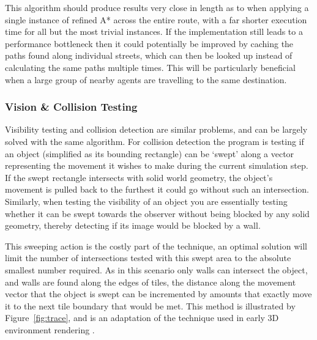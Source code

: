 \documentclass[12pt,a4paper]{article}
\begin{document}
This algorithm should produce results very close in length as to when applying a single instance of refined A* across the entire route, with a far shorter execution time for all but the most trivial instances. If the implementation still leads to a performance bottleneck then it could potentially be improved by caching the paths found along individual streets, which can then be looked up instead of calculating the same paths multiple times. This will be particularly beneficial when a large group of nearby agents are travelling to the same destination.

\subsubsection{Vision \& Collision Testing}\noindent
Visibility testing and collision detection are similar problems, and can be largely solved with the same algorithm. For collision detection the program is testing if an object (simplified as its bounding rectangle)
can be `swept' along a vector representing the movement it wishes to make during the current simulation step. If the swept rectangle intersects with solid world geometry, the object's movement is pulled back to the furthest it could go without such an intersection. Similarly, when testing the visibility of an object you are essentially testing whether it can be swept towards the observer without being blocked by any solid geometry, thereby detecting if its image would be blocked by a wall.

This sweeping action is the costly part of the technique, an optimal solution will limit the number of intersections tested with this swept area to the absolute smallest number required. As in this scenario only walls can intersect the object, and walls are found along the edges of tiles, the distance along the movement vector that the object is swept can be incremented by amounts that exactly move it to the next tile boundary that would be met. This method is illustrated by Figure~\ref{fig:trace}, and is an adaptation of the technique used in early 3D environment rendering \cite{raycast}.
\end{document}
